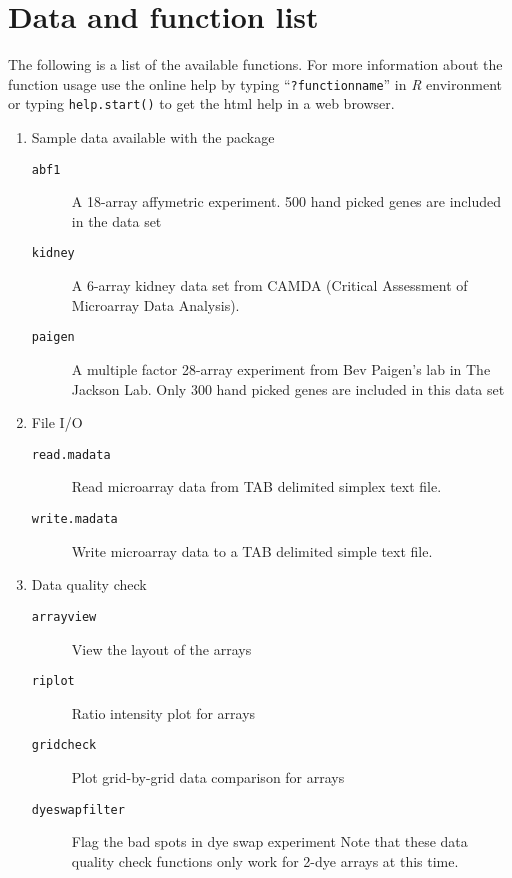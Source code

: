\newpage
\section{Data and function list}
The following is a list of the available functions. 
For more information about 
the function usage use the online help by typing ``{\tt ?functionname}''
in {\em R} environment or typing {\tt help.start()} to get the html help in 
a web browser.

\begin{enumerate}

\item Sample data available with the package
\begin{description}
\item[{\tt abf1}] A 18-array affymetric experiment. 500 hand picked genes are 
included in the data set
\item[{\tt kidney}] A 6-array kidney data set from CAMDA (Critical Assessment 
of Microarray Data Analysis). 
\item[{\tt paigen}] A multiple factor 28-array experiment from Bev
Paigen's lab in The Jackson Lab. Only 300 hand picked genes are 
included in this data set
\end{description}

\item File I/O
\begin{description}
\item[{\tt read.madata}] Read microarray data from TAB delimited simplex 
text file.
\item[{\tt write.madata}] Write microarray data to a TAB delimited simple
text file.
\end{description}

\item Data quality check
\begin{description}
\item[{\tt arrayview}] View the layout of the arrays 
\item[{\tt riplot}] Ratio intensity plot for arrays 
\item[{\tt gridcheck}] Plot grid-by-grid data comparison for arrays
\item[{\tt dyeswapfilter}] Flag the bad spots in dye swap experiment
Note that these data quality check functions only work for 2-dye
arrays at this time.
\end{description}


\end{enumerate}
